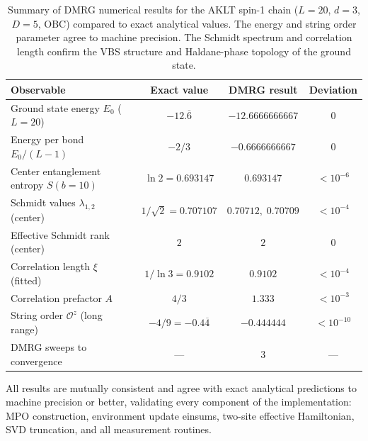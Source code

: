 \documentclass[aps,prb,onecolumn,scriptaddress]{revtex4-2}
\begin{document}
\begin{table}[h]
	\centering
	\begin{tabular}{lccc}
		\toprule
		Observable & Exact value & DMRG result & Deviation \\
		\midrule
		Ground state energy $E_0$ ($L=20$)
		& $-12.\overline{6}$
		& $-12.6666666667$
		& $0$ \\
		Energy per bond $E_0/(L-1)$
		& $-2/3$
		& $-0.6666666667$
		& $0$ \\
		Center entanglement entropy $S(b=10)$
		& $\ln 2 = 0.693147$
		& $0.693147$
		& $<10^{-6}$ \\
		Schmidt values $\lambda_{1,2}$ (center)
		& $1/\sqrt{2} = 0.707107$
		& $0.70712,\;0.70709$
		& $<10^{-4}$ \\
		Effective Schmidt rank (center)
		& $2$
		& $2$
		& $0$ \\
		Correlation length $\xi$ (fitted)
		& $1/\ln 3 = 0.9102$
		& $0.9102$
		& $<10^{-4}$ \\
		Correlation prefactor $A$
		& $4/3$
		& $1.333$
		& $<10^{-3}$ \\
		String order $\mathcal{O}^z$ (long range)
		& $-4/9 = -0.4\overline{4}$
		& $-0.444444$
		& $<10^{-10}$ \\
		DMRG sweeps to convergence
		& ---
		& $3$
		& --- \\
		\bottomrule
	\end{tabular}
	\caption{Summary of DMRG numerical results for the AKLT spin-1 chain
		($L=20$, $d=3$, $D=5$, OBC) compared to exact analytical values.
		The energy and string order parameter agree to machine precision.
		The Schmidt spectrum and correlation length confirm the VBS structure
		and Haldane-phase topology of the ground state.}
	\label{tab:aklt_summary}
\end{table}

All results are mutually consistent and agree with exact analytical
predictions to machine precision or better, validating every component
of the implementation: MPO construction, environment update einsums,
two-site effective Hamiltonian, SVD truncation, and all measurement
routines.
	
\end{document}
